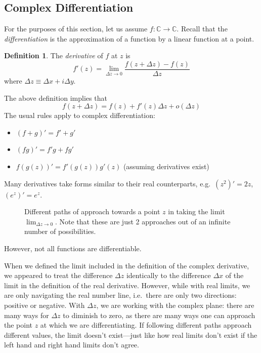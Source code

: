 \documentclass[10pt]{scrartcl}
\numberwithin{equation}{subsection}
\theoremstyle{definition}
\newtheorem{definition}{Definition}[section]
\theoremstyle{remark}
\newenvironment{definitionSR}
	{
		\begin{siderules}
			\begin{definition}
			}
			{
			\end{definition}
		\end{siderules}
	}
\newcommand{\Complex}{\mathbb{C}}
\begin{document}
\subsection{Complex Differentiation}
For the purposes of this section, let us assume $f : \Complex \to \Complex$.
Recall that the \textit{differentiation} is the approximation of a function by a
linear function at a point.
\begin{definitionSR}
	The \textit{derivative} of $f$ at $z$ is
	\begin{equation*}
		f'(z) = \lim_{\Delta z \to 0} \frac{f(z + \Delta z) -
		f(z)}{\Delta z}
	\end{equation*}
	where $\Delta z \equiv \Delta x + i \Delta y$.
\end{definitionSR}
The above definition implies that
\begin{equation}
	f(z + \Delta z) = f(z) + f'(z) \Delta z + o(\Delta z)
\end{equation}
The usual rules apply to complex differentiation:
\begin{itemize}
	\item $(f + g)' = f' + g'$
	\item $(fg)' = f'g + fg'$ 
	\item $f(g(z))' = f'(g(z))g'(z)$ (assuming derivatives exist)
\end{itemize}
Many derivatives take forms similar to their real counterparts, e.g.\ $(z^2)' =
2z$, $(e^z)' = e^z$. 
\begin{figure}
	\centering
	\caption{Different paths of approach towards a point $z$ in taking the limit
	$\lim_{\Delta z \to 0}$. Note that these are just 2 approaches out
	of an infinite number of possibilities.}
\end{figure}
However, not all functions are differentiable. 

When we defined the limit included in the definition of the complex derivative,
we appeared to treat
the difference $\Delta z$  identically to the difference $\Delta x$ of the
limit in the definition of the real derivative.
However, while with real limits, we are only navigating the real number line,
i.e.\ there are only two directions: positive or negative. With $\Delta z$, we
are working with the complex plane: there are many ways for $\Delta z$ to
diminish to zero, as there are many ways one can approach the point $z$ at
which we are differentiating. If following different paths approach different
values, the limit doesn't exist---just like how real limits don't exist if the
left hand and right hand limits don't agree. 
\end{document}
